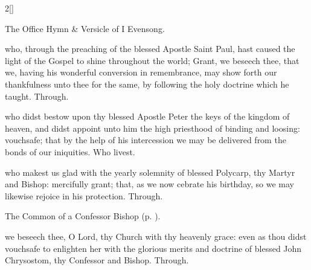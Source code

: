 \begin{paracol}{2}[]

\secondEvensong


\begin{rubric}
	The Office Hymn \& Versicle of I Evensong.
\end{rubric}


\fussy
\end{paracol}

\collect
{} who, through the preaching of the blessed Apostle Saint Paul, hast caused the light of the Gospel to shine throughout the world; Grant, we beseech thee, that we, having his wonderful conversion in remembrance, may show forth our thankfulness unto thee for the same, by following the holy doctrine which he taught. Through.

 who didst bestow upon thy blessed Apostle Peter the keys of the kingdom of heaven, and didst appoint unto him the high priesthood of binding and loosing: vouchsafe; that by the help of his intercession we may be delivered from the bonds of our iniquities. Who livest.



\memorialCollect
{} who makest us glad with the yearly solemnity of blessed Polycarp, thy Martyr and Bishop: mercifully grant; that, as we now cebrate his birthday, so we may likewise rejoice in his protection. Through.


\clearpage
{}

\begin{rubric}
	The Common of a Confessor Bishop (p. \pageref{CommonConfessorBishop}).
\end{rubric}

{} we beseech thee, O Lord, thy Church with thy heavenly grace: even as thou didst vouchsafe to enlighten her with the glorious merits and doctrine of blessed John Chrysostom, thy Confessor and Bishop. Through.


